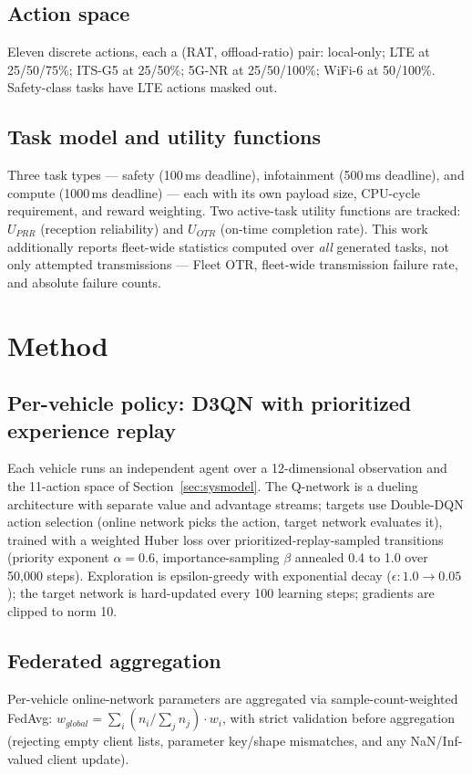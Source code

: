 \documentclass[10pt,twocolumn]{article}
\begin{document}
\subsection{Action space}
Eleven discrete actions, each a (RAT, offload-ratio) pair: local-only; LTE at 25/50/75\%; ITS-G5 at
25/50\%; 5G-NR at 25/50/100\%; WiFi-6 at 50/100\%. Safety-class tasks have LTE actions masked out.

\subsection{Task model and utility functions}
Three task types --- safety (100\,ms deadline), infotainment (500\,ms deadline), and compute
(1000\,ms deadline) --- each with its own payload size, CPU-cycle requirement, and reward
weighting. Two active-task utility functions are tracked: $U_{PRR}$ (reception reliability) and
$U_{OTR}$ (on-time completion rate). This work additionally reports fleet-wide statistics computed
over \emph{all} generated tasks, not only attempted transmissions --- Fleet OTR, fleet-wide
transmission failure rate, and absolute failure counts.

\section{Method}
\label{sec:method}

\subsection{Per-vehicle policy: D3QN with prioritized experience replay}
Each vehicle runs an independent agent over a 12-dimensional observation and the 11-action space of
Section~\ref{sec:sysmodel}. The Q-network is a dueling architecture with separate value and
advantage streams; targets use Double-DQN action selection (online network picks the action, target
network evaluates it), trained with a weighted Huber loss over prioritized-replay-sampled
transitions (priority exponent $\alpha=0.6$, importance-sampling $\beta$ annealed 0.4 to 1.0 over
50{,}000 steps). Exploration is epsilon-greedy with exponential decay ($\epsilon: 1.0 \to 0.05$);
the target network is hard-updated every 100 learning steps; gradients are clipped to norm 10.

\subsection{Federated aggregation}
Per-vehicle online-network parameters are aggregated via sample-count-weighted FedAvg:
$w_{global} = \sum_i (n_i / \sum_j n_j) \cdot w_i$, with strict validation before aggregation
(rejecting empty client lists, parameter key/shape mismatches, and any NaN/Inf-valued client
update).
\end{document}
